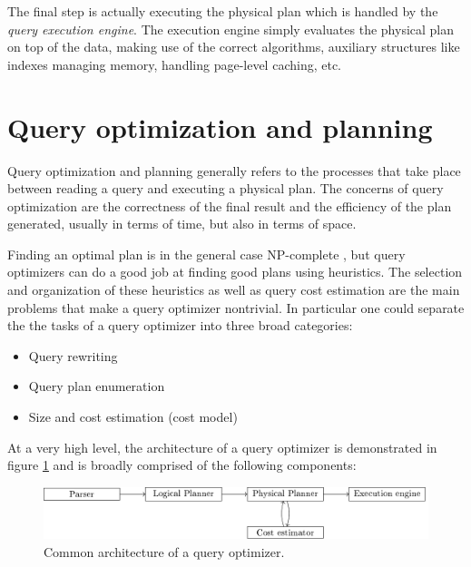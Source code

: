 The final step is actually executing the physical plan which is
handled by the \emph{query execution engine}. The execution engine
simply evaluates the physical plan on top of the data, making use of
the correct algorithms, auxiliary structures like indexes managing
memory, handling page-level caching, etc.


\section{Query optimization and planning}

Query optimization and planning generally refers to the processes that
take place between reading a query and executing a physical plan. The
concerns of query optimization are the correctness of the final result and
the efficiency of the plan generated, usually in terms of time, but
also in terms of space.

Finding an optimal plan is in the general case NP-complete
\cite{ullmanInformationIntegrationUsing1997}, but query optimizers can
do a good job at finding good plans using heuristics. The selection
and organization of these heuristics as well as query cost estimation
are the main problems that make a query optimizer nontrivial. In
particular one could separate the the tasks of a query optimizer
into three broad categories:

\begin{itemize}
\item Query rewriting
\item Query plan enumeration
\item Size and cost estimation (cost model)
\end{itemize}


At a very high level, the architecture of a query optimizer is
demonstrated in figure \ref{fig:optimizer_arch} and is broadly
comprised of the following components:

\begin{figure}[p]
\centering
\includegraphics[width=\textwidth]{./imgs/optimizer_architecture.pdf}
\caption{\label{fig:optimizer_arch}Common architecture of a query
  optimizer.}
\end{figure}

